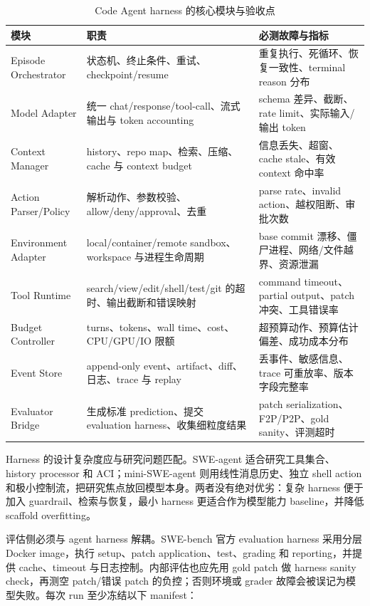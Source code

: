\documentclass[10pt,a4paper,UTF8,fontset=none]{ctexart}
\begin{document}
\begin{table}[htbp]
\centering
\caption{Code Agent harness 的核心模块与验收点}
\label{zh:tab:harness}
\small
\begin{tabularx}{\textwidth}{p{2.8cm}YY}
\toprule
模块 & 职责 & 必测故障与指标 \\
\midrule
Episode Orchestrator & 状态机、终止条件、重试、checkpoint/resume & 重复执行、死循环、恢复一致性、terminal reason 分布 \\
Model Adapter & 统一 chat/response/tool-call、流式输出与 token accounting & schema 差异、截断、rate limit、实际输入/输出 token \\
Context Manager & history、repo map、检索、压缩、cache 与 context budget & 信息丢失、超窗、cache stale、有效 context 命中率 \\
Action Parser/Policy & 解析动作、参数校验、allow/deny/approval、去重 & parse rate、invalid action、越权阻断、审批次数 \\
Environment Adapter & local/container/remote sandbox、workspace 与进程生命周期 & base commit 漂移、僵尸进程、网络/文件越界、资源泄漏 \\
Tool Runtime & search/view/edit/shell/test/git 的超时、输出截断和错误映射 & command timeout、partial output、patch 冲突、工具错误率 \\
Budget Controller & turns、tokens、wall time、cost、CPU/GPU/IO 限额 & 超预算动作、预算估计偏差、成功成本分布 \\
Event Store & append-only event、artifact、diff、日志、trace 与 replay & 丢事件、敏感信息、trace 可重放率、版本字段完整率 \\
Evaluator Bridge & 生成标准 prediction、提交 evaluation harness、收集细粒度结果 & patch serialization、F2P/P2P、gold sanity、评测超时 \\
\bottomrule
\end{tabularx}
\end{table}

Harness 的设计复杂度应与研究问题匹配。SWE-agent 适合研究工具集合、history processor 和 ACI；mini-SWE-agent 则用线性消息历史、独立 shell action 和极小控制流，把研究焦点放回模型本身\cite{zh:minisweagent2026}。两者没有绝对优劣：复杂 harness 便于加入 guardrail、检索与恢复，最小 harness 更适合作为模型能力 baseline，并降低 scaffold overfitting。

评估侧必须与 agent harness 解耦。SWE-bench 官方 evaluation harness 采用分层 Docker image，执行 setup、patch application、test、grading 和 reporting，并提供 cache、timeout 与日志控制\cite{zh:swebenchharness2026}。内部评估也应先用 gold patch 做 harness sanity check，再测空 patch/错误 patch 的负控；否则环境或 grader 故障会被误记为模型失败。每次 run 至少冻结以下 manifest：
\end{document}
